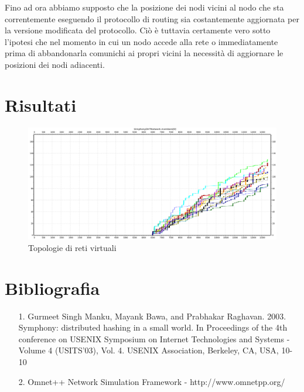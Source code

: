 \documentclass[	
	DIV=calc,
	paper=a4,
	fontsize=11pt,
	onecolumn
]{scrartcl} %
\begin{document}
Fino ad ora abbiamo supposto che la posizione dei nodi vicini al nodo che sta correntemente eseguendo il protocollo di routing sia costantemente aggiornata per la versione modificata del protocollo. Ciò è tuttavia certamente vero sotto l'ipotesi che nel momento in cui un nodo accede alla rete o immediatamente prima di abbandonarla comunichi ai propri vicini la necessità di aggiornare le posizioni dei nodi adiacenti.
\section{Risultati}


\begin{figure}[H]
	\centering
	\includegraphics[scale=0.35]{SymphonyDHTMod/plots/MessagesSentByEveryNode/128_Nodes_FastAccess/SymphonyDHTMod_128Nodes_FastAccess_Node0.png}
	\caption{Topologie di reti virtuali}
	\label{Figura 1}
\end{figure}



\section{Bibliografia}
\begin{itemize}
\item[1.] Gurmeet Singh Manku, Mayank Bawa, and Prabhakar Raghavan. 2003. Symphony: distributed
hashing in a small world. In Proceedings of the 4th conference on USENIX Symposium on
Internet Technologies and Systems - Volume 4 (USITS'03), Vol. 4. USENIX Association,
Berkeley, CA, USA, 10-10
\item[2.] Omnet++ Network Simulation Framework - http://www.omnetpp.org/ 
\end{itemize}
\end{document}
